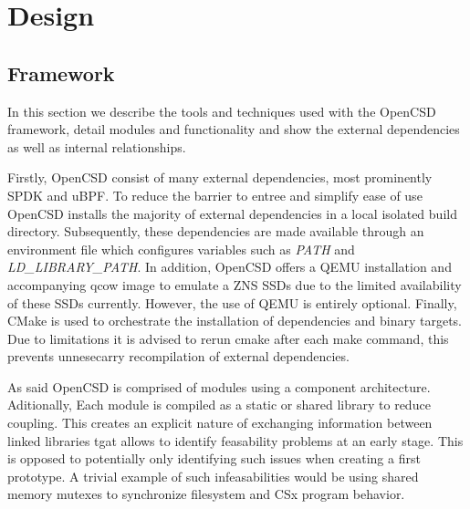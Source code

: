 
\chapter{Design} %



\ifpdf
    \graphicspath{{7/figures/PNG/}{7/figures/PDF/}{7/figures/}}
\else
    \graphicspath{{7/figures/EPS/}{7/figures/}}
\fi


% 

\section{Framework}

In this section we describe the tools and techniques used with the OpenCSD
framework, detail modules and functionality and show the external dependencies
as well as internal relationships.

Firstly, OpenCSD consist of many external dependencies, most prominently SPDK
and uBPF. To reduce the barrier to entree and simplify ease of use OpenCSD
installs the majority of external dependencies in a local isolated build
directory. Subsequently, these dependencies are made available through an
environment file which configures variables such as \textit{PATH} and
\textit{LD\_LIBRARY\_PATH}. In addition, OpenCSD offers a QEMU installation and
accompanying qcow image to emulate a ZNS SSDs due to the limited availability of
these SSDs currently. However, the use of QEMU is entirely optional. Finally,
CMake is used to orchestrate the installation of dependencies and binary
targets. Due to limitations it is advised to rerun cmake after each make
command, this prevents unnesecarry recompilation of external dependencies.

As said OpenCSD is comprised of modules using a component architecture.
Aditionally, Each module is compiled as a static or shared library to reduce
coupling. This creates an explicit nature of exchanging information between
linked libraries tgat allows to identify feasability problems at an early stage.
This is opposed to potentially only identifying such issues when creating a
first prototype. A trivial example of such infeasabilities would be using shared
memory mutexes to synchronize filesystem and CSx program behavior.

